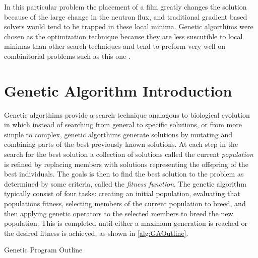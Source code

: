 In this particular problem the placement of a film greatly changes the solution because of the large change in the neutron flux, and traditional gradient based solvers would tend to be trapped in these local minima.
Genetic algorthims were chosen as the optimization technique because they are less suscutible to local minimas than other search techniques and tend to preform very well on combinitorial problems such as this one \cite{Mitchell}.

\section{Genetic Algorithm Introduction}
Genetic algorthims provide a search technique analagous to biological evolution in which instead of searching from general to specific solutions, or from more simple to complex, genetic algorthims generate solutions by mutating and combining parts of the best previously known solutions.
At each step in the search for the best solution a collection of solutions called the current \textit{population} is refined by replacing members with solutions representing the offspring of the best individuals.
The goals is then to find the best solution to the problem as determined by some criteria, called the \textit{fitness function}.
The genetic algorithm typically consist of four tasks: creating an initial population, evaluating that populations fitness, selecting members of the current population to breed, and then applying genetic operators to the selected members to breed the new population. 
This is completed until either a maximum generation is reached or the desired fitness is achieved, as shown in \autoref{alg:GAOutline}.
\begin{algorithm}
  \caption{Genetic Program Outline}
  \label{alg:GAOutline}
  \begin{algorithmic}
      \ENDFOR
      }
    \ENDWHILE
  \end{algorithmic}
\end{algorithm}


